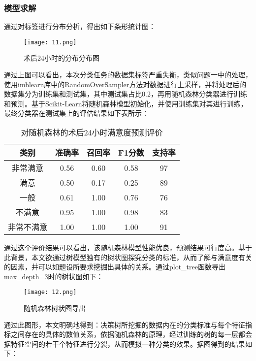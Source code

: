 \subsubsection{模型求解}

通过对标签进行分布分析，得出如下条形统计图：

\begin{figure}[H] %
	\centering %
	\texttt{[image: 11.png]} 
	\label{Fig.main11} 
    \caption{术后24小时的分布分布图}
\end{figure}

通过上图可以看出，本次分类任务的数据集标签严重失衡，类似问题一中的处理，使用imblearn库中的RandomOverSampler方法对数据进行上采样，并将处理后的数据集分为训练集和测试集，其中测试集占比0.2，再用随机森林分类器进行训练和预测。基于Scikit-Learn将随机森林模型初始化，并使用训练集对其进行训练，最终分类器在测试集上的评估结果如下表所示：

\begin{table}[H]
    \centering  
    \caption{对随机森林的术后24小时满意度预测评价}
    \begin{tabular}{c c c c c}  
    	\toprule[1.5pt]  
    	类别 & 准确率 & 召回率 & F1分数 & 支持率 \\  
    	\midrule[1pt]    
        非常满意    & 0.56 & 0.60 & 0.58 & 97 \\ 
        满意        & 0.50 & 0.17 & 0.25 & 89 \\ 
        一般        & 0.61 & 1.00 & 0.76 & 76 \\ 
        不满意      & 0.95 & 1.00 & 0.98 & 83 \\ 
        非常不满意  & 1.00 & 1.00 & 1.00 & 91 \\ 
    	\toprule[1.5pt]  
    \end{tabular}  
\end{table} 

通过这个评价结果可以看出，该随机森林模型性能优良，预测结果可行度高。基于此背景，本文欲通过树模型独有的树状图探究分类的标准，从而了解与满意度有关的因素，并可以如题设所要求挖掘出具体的关系。通过plot\_tree函数导出max\_depth=3时的树状图如下：

\begin{figure}[H] %
	\centering %
	\texttt{[image: 12.png]} 
	\label{Fig.main12} 
    \caption{随机森林树状图导出}
\end{figure}

通过此图形，本文明确地得到：决策树所挖掘的数据内在的分类标准与每个特征指标之间存在的具体的数值关系，依据随机森林的原理，经过训练的树的每一层都会据特征空间的若干个特征进行分裂，从而模拟一种分类的效果。据图得到的结果如下：


